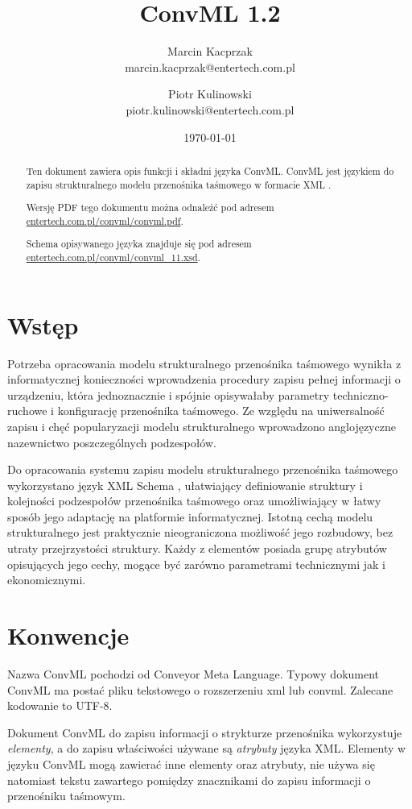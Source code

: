 \documentclass[12pt,a4paper]{article}
\title{ConvML 1.2}
\author{Marcin Kacprzak\\ marcin.kacprzak@entertech.com.pl\\
  \and Piotr Kulinowski\\ piotr.kulinowski@entertech.com.pl}
\date{\today}
\begin{document}
\maketitle

\begin{abstract}
  Ten dokument zawiera opis funkcji i składni języka ConvML.  ConvML jest
  językiem do zapisu strukturalnego modelu przenośnika taśmowego w formacie XML
  \cite{XML10}.

  Wersję PDF tego dokumentu można odnaleźć pod adresem
  \href{http://www.entertech.com.pl/convml/convml.pdf}{entertech.com.pl/convml/convml.pdf}.

  Schema opisywanego języka znajduje się pod adresem
  \href{http://www.entertech.com.pl/convml/convml\_11.xsd}{entertech.com.pl/convml/convml\_11.xsd}.
\end{abstract}

\tableofcontents


\section{Wstęp}
Potrzeba opracowania modelu strukturalnego przenośnika taśmowego wynikła z
informatycznej konieczności wprowadzenia procedury zapisu pełnej informacji o
urządzeniu, która jednoznacznie i spójnie opisywałaby parametry
techniczno-ruchowe i konfigurację przenośnika taśmowego.  Ze względu na
uniwersalność zapisu i chęć popularyzacji modelu strukturalnego wprowadzono
anglojęzyczne nazewnictwo poszczególnych podzespołów.

Do opracowania systemu zapisu modelu strukturalnego przenośnika taśmowego
wykorzystano język XML Schema \cite{XSD0}, ułatwiający definiowanie struktury i
kolejności podzespołów przenośnika taśmowego oraz umożliwiający w łatwy sposób
jego adaptację na platformie informatycznej.  Istotną cechą modelu
strukturalnego jest praktycznie nieograniczona możliwość jego rozbudowy, bez
utraty przejrzystości struktury.  Każdy z elementów posiada grupę atrybutów
opisujących jego cechy, mogące być zarówno parametrami technicznymi jak i
ekonomicznymi.


\section{Konwencje}
Nazwa ConvML pochodzi od Conveyor Meta Language.  Typowy dokument ConvML ma
postać pliku tekstowego o rozszerzeniu xml lub convml.  Zalecane kodowanie to
UTF-8.

Dokument ConvML do zapisu informacji o strykturze przenośnika wykorzystuje
\emph{elementy}, a do zapisu właściwości używane są \emph{atrybuty} języka XML.
Elementy w języku ConvML mogą zawierać inne elementy oraz atrybuty, nie używa
się natomiast tekstu zawartego pomiędzy znacznikami do zapisu informacji o
przenośniku taśmowym.
\end{document}
